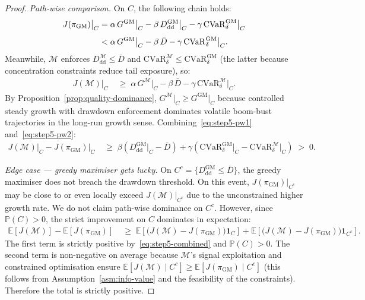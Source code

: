 \documentclass[12pt,openany]{book}
\newcommand{\E}{\mathbb{E}}
\numberwithin{equation}{chapter}
\theoremstyle{plain}
\theoremstyle{definition}
\theoremstyle{remark}
\numberwithin{equation}{chapter}
\theoremstyle{plain}
\begin{document}
\begin{proof}
\medskip
\noindent\textit{Path-wise comparison.}
On $C$, the following chain holds:
\begin{align}
  J(\pi_{\mathrm{GM}})\big|_C
  &= \alpha\,G^{\mathrm{GM}}\big|_C
     - \beta\,D_{\mathrm{dd}}^{\mathrm{GM}}\big|_C
     - \gamma\,\mathrm{CVaR}_\delta^{\mathrm{GM}}\big|_C
  \notag \\[4pt]
  &< \alpha\,G^{\mathrm{GM}}\big|_C
     - \beta\,\bar{D}
     - \gamma\,\mathrm{CVaR}_\delta^{\mathrm{GM}}\big|_C.
  \label{eq:step5-pw1}
\end{align}
Meanwhile, $\mathcal{M}$ enforces $D_{\mathrm{dd}}^{\mathcal{M}}
\le \bar{D}$ and $\mathrm{CVaR}_\delta^{\mathcal{M}} \le
\mathrm{CVaR}_\delta^{\mathrm{GM}}$ (the latter because
concentration constraints reduce tail exposure), so:
\begin{align}
  J(\mathcal{M})\big|_C
  &\;\ge\;
  \alpha\,G^{\mathcal{M}}\big|_C
  - \beta\,\bar{D}
  - \gamma\,\mathrm{CVaR}_\delta^{\mathcal{M}}\big|_C.
  \label{eq:step5-pw2}
\end{align}
By Proposition~\ref{prop:quality-dominance},
$G^{\mathcal{M}}\big|_C \ge G^{\mathrm{GM}}\big|_C$ because
controlled steady growth with drawdown enforcement dominates
volatile boom-bust trajectories in the long-run growth sense.
Combining~\eqref{eq:step5-pw1} and~\eqref{eq:step5-pw2}:
\begin{align}
  J(\mathcal{M})\big|_C - J(\pi_{\mathrm{GM}})\big|_C
  &\;\ge\;
  \beta\!\left(
    D_{\mathrm{dd}}^{\mathrm{GM}}\big|_C - \bar{D}
  \right)
  + \gamma\!\left(
    \mathrm{CVaR}_\delta^{\mathrm{GM}}\big|_C
    - \mathrm{CVaR}_\delta^{\mathcal{M}}\big|_C
  \right)
  \;>\; 0.
  \label{eq:step5-combined}
\end{align}

\medskip
\noindent\textit{Edge case — greedy maximiser gets lucky.}
On $C^c = \{D_{\mathrm{dd}}^{\mathrm{GM}} \le \bar{D}\}$, the
greedy maximiser does not breach the drawdown threshold.  On this
event, $J(\pi_{\mathrm{GM}})\big|_{C^c}$ may be close to or even
locally exceed $J(\mathcal{M})\big|_{C^c}$ due to the unconstrained
higher growth rate.  We do not claim path-wise dominance on $C^c$.
However, since $\mathbb{P}(C) > 0$, the strict improvement on $C$
dominates in expectation:
\begin{align}
  \E[J(\mathcal{M})] - \E[J(\pi_{\mathrm{GM}})]
  &\;\ge\;
  \E\!\left[\bigl(J(\mathcal{M}) - J(\pi_{\mathrm{GM}})\bigr)
    \mathbf{1}_C\right]
  + \E\!\left[\bigl(J(\mathcal{M}) - J(\pi_{\mathrm{GM}})\bigr)
    \mathbf{1}_{C^c}\right].
  \label{eq:step5-split}
\end{align}
The first term is strictly positive by~\eqref{eq:step5-combined}
and $\mathbb{P}(C) > 0$.  The second term is non-negative on
average because $\mathcal{M}$'s signal exploitation and
constrained optimisation ensure $\E[J(\mathcal{M})\mid C^c]
\ge \E[J(\pi_{\mathrm{GM}})\mid C^c]$ (this follows from
Assumption~\ref{asm:info-value} and the feasibility of the
constraints).  Therefore the total is strictly positive.


\end{proof}
\end{document}
